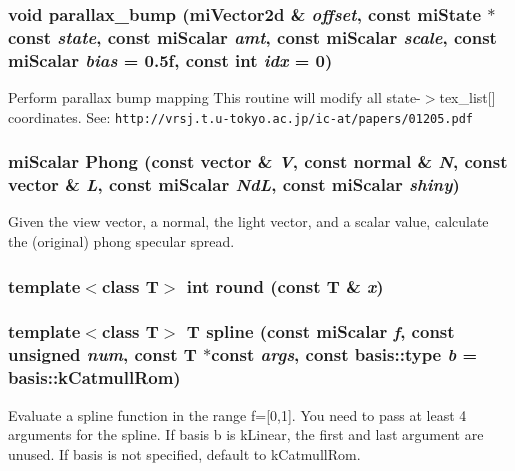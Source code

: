 \subsubsection{\setlength{\rightskip}{0pt plus 5cm}void parallax\_\-bump (mi\-Vector2d \& {\em offset}, const mi\-State $\ast$const {\em state}, const mi\-Scalar {\em amt}, const mi\-Scalar {\em scale}, const mi\-Scalar {\em bias} = 0.5f, const int {\em idx} = 0)\hspace{0.3cm}{\tt  [inline]}}\label{namespacemr_a20}


Perform parallax bump mapping This routine will modify all state-$>$tex\_\-list[] coordinates. See: {\tt http://vrsj.t.u-tokyo.ac.jp/ic-at/papers/01205.pdf} 
\subsubsection{\setlength{\rightskip}{0pt plus 5cm}mi\-Scalar Phong (const vector \& {\em V}, const normal \& {\em N}, const vector \& {\em L}, const mi\-Scalar {\em Nd\-L}, const mi\-Scalar {\em shiny})\hspace{0.3cm}{\tt  [inline]}}\label{namespacemr_a77}


Given the view vector, a normal, the light vector, and a scalar value, calculate the (original) phong specular spread. 
\subsubsection{\setlength{\rightskip}{0pt plus 5cm}template$<$class T$>$ int round (const T \& {\em x})\hspace{0.3cm}{\tt  [inline]}}\label{namespacemr_a62}


\subsubsection{\setlength{\rightskip}{0pt plus 5cm}template$<$class T$>$ T spline (const mi\-Scalar {\em f}, const unsigned {\em num}, const T $\ast$const {\em args}, const basis::type {\em b} = basis::k\-Catmull\-Rom)\hspace{0.3cm}{\tt  [inline]}}\label{namespacemr_a80}


Evaluate a spline function in the range f=[0,1]. You need to pass at least 4 arguments for the spline. If basis b is k\-Linear, the first and last argument are unused. If basis is not specified, default to k\-Catmull\-Rom. 
